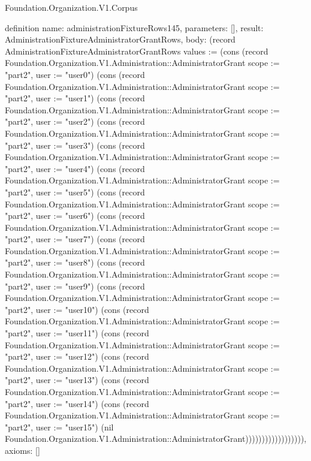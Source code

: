 \begin{lexlean}{Foundation.Organization.V1.Corpus}
\begin{semanticmodule}
definition{
  name: administrationFixtureRows145,
  parameters: [],
  result: AdministrationFixtureAdministratorGrantRows,
  body: (record AdministrationFixtureAdministratorGrantRows {values := (cons (record Foundation.Organization.V1.Administration::AdministratorGrant {scope := "part2", user := "user0"}) (cons (record Foundation.Organization.V1.Administration::AdministratorGrant {scope := "part2", user := "user1"}) (cons (record Foundation.Organization.V1.Administration::AdministratorGrant {scope := "part2", user := "user2"}) (cons (record Foundation.Organization.V1.Administration::AdministratorGrant {scope := "part2", user := "user3"}) (cons (record Foundation.Organization.V1.Administration::AdministratorGrant {scope := "part2", user := "user4"}) (cons (record Foundation.Organization.V1.Administration::AdministratorGrant {scope := "part2", user := "user5"}) (cons (record Foundation.Organization.V1.Administration::AdministratorGrant {scope := "part2", user := "user6"}) (cons (record Foundation.Organization.V1.Administration::AdministratorGrant {scope := "part2", user := "user7"}) (cons (record Foundation.Organization.V1.Administration::AdministratorGrant {scope := "part2", user := "user8"}) (cons (record Foundation.Organization.V1.Administration::AdministratorGrant {scope := "part2", user := "user9"}) (cons (record Foundation.Organization.V1.Administration::AdministratorGrant {scope := "part2", user := "user10"}) (cons (record Foundation.Organization.V1.Administration::AdministratorGrant {scope := "part2", user := "user11"}) (cons (record Foundation.Organization.V1.Administration::AdministratorGrant {scope := "part2", user := "user12"}) (cons (record Foundation.Organization.V1.Administration::AdministratorGrant {scope := "part2", user := "user13"}) (cons (record Foundation.Organization.V1.Administration::AdministratorGrant {scope := "part2", user := "user14"}) (cons (record Foundation.Organization.V1.Administration::AdministratorGrant {scope := "part2", user := "user15"}) (nil Foundation.Organization.V1.Administration::AdministratorGrant)))))))))))))))))}),
  axioms: []
}


\end{semanticmodule}
\end{lexlean}
